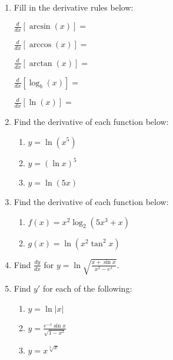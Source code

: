 \documentclass[11pt,fleqn]{article}
\begin{document}
\setlength{\parindent}{0cm}
\renewcommand{\headrulewidth}{0pt}
\newcommand{\blank}[1]{\rule{#1}{0.75pt}}
\renewcommand{\d}{\displaystyle}
\vspace*{-0.7in}
\begin{center}
 {\large{ }}
\end{center}
\begin{enumerate}
\item Fill in the derivative rules below:\\
	\begin{multicols}{2}
	$\d{\frac{d}{dx}\left[\arcsin(x) \right]=}$\\
	\vspace{.15in}
	
	$\d{\frac{d}{dx}\left[\arccos(x) \right]=}$\\
	\vspace{.15in}
	
	$\d{\frac{d}{dx}\left[\arctan(x) \right]=}$\\
	\vspace{.15in}
	
	$\d{\frac{d}{dx}\left[\log_b(x) \right]=}$\\
	\vspace{.15in}
	
	$\d{\frac{d}{dx}\left[\ln(x) \right]=}$\\
	\vspace{.15in}
	\end{multicols}
\item Find the derivative of each function below:\\
	\begin{multicols}{3}
	\begin{enumerate}
	\item $y=\ln(x^5)$
	\vfill
	\item $y=(\ln x )^5$
	\vfill 
	\item $y= \ln(5x)$
	\vfill
	\end{enumerate}
	\end{multicols}
\vfill
\item Find the derivative of each function below:
	\begin{enumerate}
	\item $f(x)=x^2\log_2(5x^3 +x)$
	\vfill
	\item $g(x)=\ln(x^2 \tan^2x)$
	\vfill
	\end{enumerate}
	\newpage
\item Find $\frac{dy}{dx}$ for $y=\ln\sqrt{ \frac{x + \sin x}{x^2-e^x}}.$
\vfill
\item Find $y'$ for each of the following:
	\begin{enumerate}
	\item $y=\ln|x|$
	\vfill
	\item $y=\frac{e^{-x}\sin x}{\sqrt{1-x^2}}$
	\vfill
	\item $y=x^{\sqrt[3]{x}}$
	\vfill
	\end{enumerate}
\end{enumerate}
\end{document}
